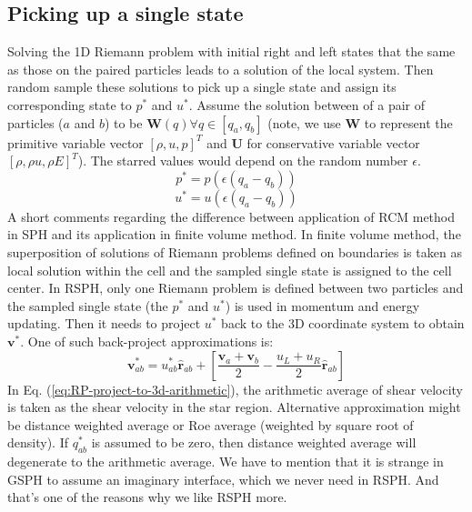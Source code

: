 \documentclass[review]{elsarticle}
\begin{document}
\subsection{Picking up a single state}
Solving the 1D Riemann problem with initial right and left states that the same as those on the paired particles leads to a solution of the local system. Then random sample these solutions to pick up a single state and assign its corresponding state to $p^{\ast}$ and $u^{\ast}$. 
Assume the solution between of a pair of particles ($a$ and $b$) to be $\textbf{W} (q) \forall q \in [q_a, q_b]$ (note, we use $\textbf{W}$ to represent the primitive variable vector $[\rho, u, p]^T$ and $\textbf{U}$ for conservative variable vector  $[\rho, \rho u, \rho E]^T$). The starred values would depend on the random number $\epsilon$.
\begin{equation}
p^{\ast} = p \left(\epsilon \left( q_a - q_b \right) \right)
\label{eq:RSPH-Random-Pick-p}
\end{equation}
\begin{equation}
u^{\ast} = u \left(\epsilon \left( q_a - q_b \right) \right)
\label{eq:RSPH-Random-Pick-u}
\end{equation}
A short comments regarding the difference between application of RCM method in SPH and its application in finite volume method. In finite volume method, the superposition of solutions of Riemann problems defined on boundaries is taken as local solution within the cell and the sampled single state is assigned to the cell center. In RSPH, only one Riemann problem is defined between two particles and the sampled single state (the $p^{\ast}$ and $u^{\ast}$) is used in momentum and energy updating.
Then it needs to project $u^{\ast}$ back to the 3D coordinate system to obtain $\textbf{v}^{\ast}$. One of such back-project approximations is:
\begin{equation}
\textbf{v}^{\ast}_{a b}=u^{\ast}_{a b} \hat{\textbf{r}}_{a b} + \left [\frac{\textbf{v}_{a} + \textbf{v}_{b}}{2} - \frac{u_L + u_R}{2} \hat{\textbf{r}}_{a b}\right]
\label{eq:RP-project-to-3d-arithmetic}
\end{equation}
In Eq. (\ref{eq:RP-project-to-3d-arithmetic}), the arithmetic average of shear velocity is taken as the shear velocity in the star region. Alternative approximation might be distance weighted average or Roe average (weighted by square root of density). If $q_{a b}^{\ast}$ is assumed to be zero, then distance weighted average will degenerate to the arithmetic average.
We have to mention that it is strange in GSPH to assume an imaginary interface, which we never need in RSPH. And that's one of the reasons why we like RSPH more.
\end{document}
